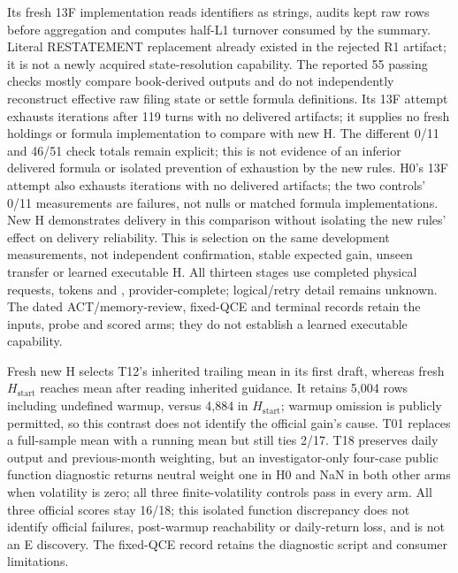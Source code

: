 Its fresh 13F implementation reads identifiers as strings, audits kept raw
rows before aggregation and computes half-L1 turnover consumed by the summary.
Literal RESTATEMENT replacement already existed in the rejected R1 artifact;
it is not a newly acquired state-resolution capability.
The reported 55 passing checks mostly compare book-derived outputs and do
not independently reconstruct effective raw filing state or settle formula
definitions.
 Its 13F attempt exhausts iterations after 119 turns with no
delivered artifacts; it supplies no fresh holdings or formula implementation
to compare with new H. The different 0/11 and 46/51 check totals remain
explicit; this is not evidence of an inferior delivered formula or isolated
prevention of exhaustion by the new rules.
H0's 13F attempt also exhausts iterations with no delivered artifacts; the
two controls' 0/11 measurements are failures, not nulls or matched formula
implementations. New H demonstrates delivery in this comparison without
isolating the new rules' effect on delivery reliability.
This is selection on the same development measurements, not independent
confirmation, stable expected gain, unseen transfer or learned executable H.
All thirteen stages use \RejectedBranchRTwoFinalRequests{} completed physical
requests, \RejectedBranchRTwoFinalTokens{} tokens and
\RejectedBranchRTwoFinalCost{}, provider-complete; logical/retry detail
remains unknown.
The dated ACT/memory-review, fixed-QCE and terminal records retain the inputs, probe
and scored arms; they do not establish a learned executable capability.

Fresh new H selects T12's inherited trailing mean in its first draft, whereas
fresh $H_{\mathrm{start}}$ reaches mean after reading inherited guidance. It retains
5,004 rows including undefined warmup, versus 4,884 in $H_{\mathrm{start}}$;
warmup omission is publicly permitted, so this contrast does not identify
the official gain's cause. T01 replaces a full-sample mean with a running
mean but still ties 2/17. T18 preserves daily output and previous-month
weighting, but an investigator-only four-case public function diagnostic
returns neutral weight one in H0 and NaN in both other arms when volatility
is zero; all three finite-volatility controls pass in every arm.
All three official scores stay 16/18; this isolated function discrepancy does
not identify official failures, post-warmup reachability or daily-return loss,
and is not an E discovery. The fixed-QCE record retains the diagnostic script
and consumer limitations.

